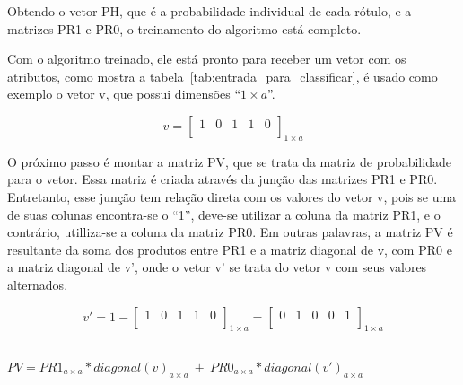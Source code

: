 \begin{anexosenv}
Obtendo o vetor PH, que é a probabilidade individual de cada rótulo, e a
matrizes PR1 e PR0, o treinamento do algoritmo está completo.

Com o algoritmo treinado, ele está pronto para receber um vetor com
os atributos, como mostra a tabela~\ref{tab:entrada_para_classificar},
é usado como exemplo o vetor v, que possui dimensões ``${1 \times a}$''.

$$v=\left[
\begin{array}{ccccc}
1 & 0 & 1 & 1 & 0 \\
\end{array}
\right]_{1 \times a}$$

O próximo passo é montar a matriz PV, que se trata da matriz de
probabilidade para o vetor. Essa matriz é criada através da junção das matrizes
PR1 e PR0. Entretanto, esse junção tem relação direta com os valores do vetor v,
pois se uma de suas colunas encontra-se o ``1'', deve-se utilizar a coluna da matriz PR1,
e o contrário, utilliza-se a coluna da matriz PR0. Em outras palavras, a matriz PV é resultante
da soma dos produtos entre PR1 e a matriz diagonal de v, com PR0
e a matriz diagonal de v', onde o vetor v' se trata do vetor v com seus valores
alternados.

$$v'=1-\left[
\begin{array}{ccccc}
1 & 0 & 1 & 1 & 0 \\
\end{array}
\right]_{1 \times a}
=
\left[
\begin{array}{ccccc}
0 & 1 & 0 & 0 & 1 \\
\end{array}
\right]_{1 \times a}
$$
\\

\begin{center}
$PV = PR1_{a \times a} * diagonal(v)_{a \times a} \ + \ PR0_{a \times a} * diagonal(v')_{a \times a}$
\end{center}


\end{anexosenv}
